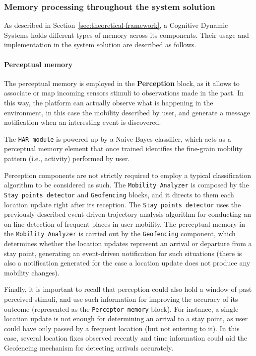 \documentclass[ENG,PhD]{cinvestav}
\begin{document}
\subsubsection{Memory processing throughout the system solution}
As described in Section~\ref{sec:theoretical-framework}, a Cognitive Dynamic Systems holds different types of memory across its components.
Their usage and implementation in the system solution are described as follows.

\paragraph{Perceptual memory} 
The perceptual memory is employed in the \textbf{Perception} block, as it allows to associate or map incoming sensors stimuli to observations made in the past.
In this way, the platform can actually observe what is happening in the environment, in this case the mobility described by user, and generate a message notification when an interesting event is discovered.

The \texttt{HAR module} is powered up by a Naive Bayes classifier, which acts as a perceptual memory element that once trained identifies the fine-grain mobility pattern (i.e., activity) performed by user.

Perception components are not strictly required to employ a typical classification algorithm to be considered as such.
The \texttt{Mobility Analyzer} is composed by the \texttt{Stay points detector} and \texttt{Geofencing} blocks, and it directs to them each location update right after its reception.
The \texttt{Stay points detector} uses the previously described event-driven trajectory analysis algorithm for conducting an on-line detection of frequent places in user mobility.
The perceptual memory in the \texttt{Mobility Analyzer} is carried out by the \texttt{Geofencing} component, which determines whether the location updates represent an arrival or departure from a stay point, generating an event-driven notification for such situations (there is also a notification generated for the case a location update does not produce any mobility changes).

Finally, it is important to recall that perception could also hold a window of past perceived stimuli, and use such information for improving the accuracy of its outcome (represented as the \texttt{Perceptor memory} block).
For instance, a single location update is not enough for determining an arrival to a stay point, as user could have only passed by a frequent location (but not entering to it).
In this case, several location fixes observed recently and time information could aid the Geofencing mechanism for detecting arrivals accurately.
\end{document}
